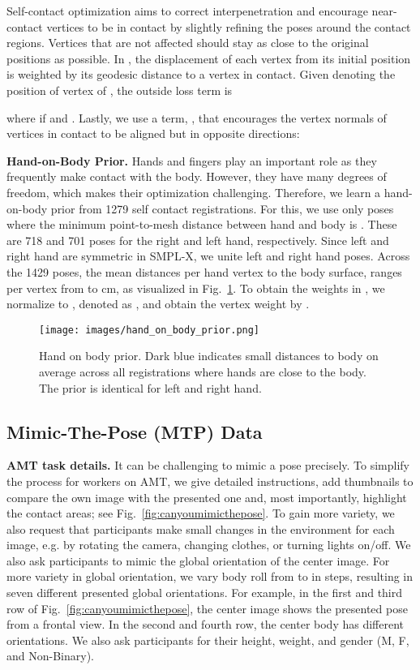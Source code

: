 \documentclass[final]{cvpr}
\renewcommand{\eg}{e.g.\xspace}
\theoremstyle{definition}
\begin{document}
Self-contact optimization aims to correct interpenetration and encourage near-contact vertices to be in contact by slightly refining the poses around the contact regions. 
Vertices that are not affected should stay as close to the original positions as possible.
In , the displacement of each vertex from its initial position is weighted by its geodesic distance to a vertex in contact. 
Given  denoting the position of vertex  of , the outside loss term is

where  if  and . 
Lastly, we use a term, , that encourages the vertex normals  of vertices in contact to be aligned but in opposite directions:


\textbf{Hand-on-Body Prior.} Hands and fingers play an important role as they frequently make contact with the body. However, they have many degrees of freedom, which makes their optimization challenging. Therefore, we learn a hand-on-body prior from 1279 self contact registrations. For this, we use only poses where the minimum point-to-mesh distance between hand and body is . These are 718 and 701 poses for the right and left hand, respectively. Since left and right hand are symmetric in SMPL-X, we unite left and right hand poses. Across the 1429 poses, the mean distances per hand vertex to the body surface,  ranges per vertex from  to  cm, as visualized in Fig.~\ref{fig:handonbodyprior}. To obtain the weights  in , we normalize  to , denoted as , and obtain the vertex weight by .
\begin{figure}[t]
	\begin{center}
		\texttt{[image: images/hand\_on\_body\_prior.png]}
	\end{center}
	\caption{Hand on body prior. Dark blue indicates small distances to body on average across all registrations where hands are close to the body. The prior is identical for left and right hand.}
	\label{fig:handonbodyprior}
\end{figure}


\subsection{Mimic-The-Pose (MTP) Data}
\textbf{AMT task details.} It can be challenging to mimic a pose precisely. To simplify the process for workers on AMT, we give detailed instructions, add thumbnails to compare the own image with the presented one and, most importantly, highlight the contact areas; see Fig.~\ref{fig:canyoumimicthepose}. To gain more variety, we also request that participants make small changes in the environment for each image, \eg by  rotating the camera, changing clothes, or turning lights on/off. We also ask participants to mimic the global orientation of the center image. For more variety in global orientation, we vary body roll from  to  in  steps, resulting in seven different presented global orientations. For example, in the first and third row of Fig.~\ref{fig:canyoumimicthepose}, the center image shows the presented pose from a frontal view. In the second and fourth row, the center body has different orientations. We also ask participants for their height, weight, and gender (M, F, and Non-Binary).
\end{document}
